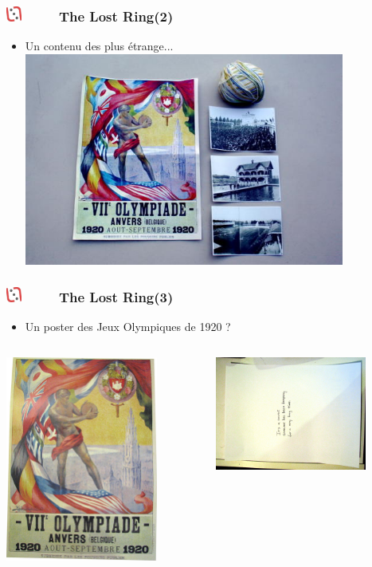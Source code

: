 \documentclass[slidetop,11pt]{beamer}
\def\sectionPartIIaIV{The Lost Ring}
\def\moreInFrameTitleLeftt{\includegraphics[height=0.5cm]{img/ligueludique-0.png}~~~~~}
\begin{document}
\begin{frame}
	\frametitle{\moreInFrameTitleLeftt \sectionPartIIaIV  (2) }
	\begin{itemize}
		\item Un contenu des plus {\'e}trange...
		\includegraphics[height=7.00cm]{img/argTheLostRing/Fronts_and_string_540x359.jpg}
	\end{itemize}
\end{frame} 

\begin{frame}
	\frametitle{\moreInFrameTitleLeftt \sectionPartIIaIV  (3) }
	\begin{itemize}
		\item Un poster des Jeux Olympiques de 1920 ?
	\end{itemize}
	\begin{columns}[T]
		\begin{column}[T]{5.05cm}
			\includegraphics[width=5.00cm]{img/argTheLostRing/2298573863_8f55746c43_o.jpg}
		\end{column}
		\begin{column}[T]{5.05cm}
			\includegraphics[width=5.00cm]{img/argTheLostRing/2298573691_f5614cb457_o.jpg}
		\end{column}
	\end{columns}
\end{frame} 
\end{document}
